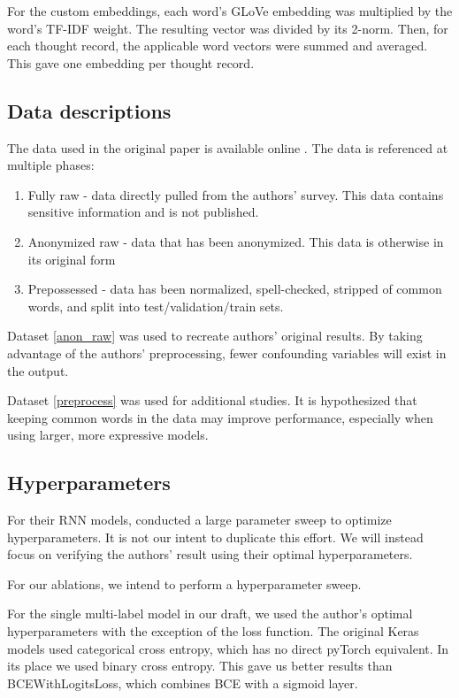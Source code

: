 \documentclass[11pt,a4paper]{article}
\begin{document}
For the custom embeddings, each word's GLoVe embedding was multiplied by the word's TF-IDF weight. The resulting vector was divided by its 2-norm. Then, for each thought record, the applicable word vectors were summed and averaged. This gave one embedding per thought record.

\subsection{Data descriptions}
The data used in the original paper is available online \citep{burger_2021_data}. The data is referenced at multiple phases: 
\begin{enumerate}
    \item Fully raw - data directly pulled from the authors' survey. This data contains sensitive information and is not published. 
    \item Anonymized raw - data that has been anonymized. This data is otherwise in its original form
    \label{anon_raw}
    \item Prepossessed - data has been normalized, spell-checked, stripped of common words, and split into test/validation/train sets. 
    \label{preprocess}
\end{enumerate}

Dataset \ref{anon_raw} was used to recreate authors' original results. By taking advantage of the authors' preprocessing, fewer confounding variables will exist in the output. 

Dataset \ref{preprocess} was used for additional studies. It is hypothesized that keeping common words in the data may improve performance, especially when using larger, more expressive models. 

\subsection{Hyperparameters}
For their RNN models, \citeauthor{burger_2021} conducted a large parameter sweep to optimize hyperparameters. It is not our intent to duplicate this effort. We will instead focus on verifying the authors' result using their optimal hyperparameters.

For our ablations, we intend to perform a hyperparameter sweep. 

For the single multi-label model in our draft, we used the author's optimal hyperparameters with the exception of the loss function. The original Keras models used categorical cross entropy, which has no direct pyTorch equivalent. In its place we used binary cross entropy. This gave us better results than BCEWithLogitsLoss, which combines BCE with a sigmoid layer.
\end{document}
